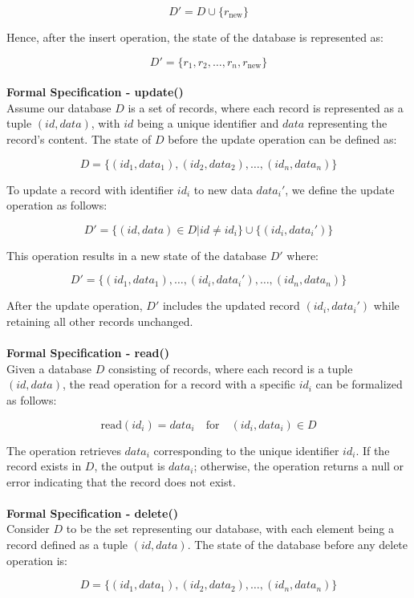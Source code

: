 \documentclass[12pt, titlepage]{article}
\begin{document}
\[
D' = D \cup \{r_{\text{new}}\}
\]

Hence, after the insert operation, the state of the database is represented as:

\[
D' = \{r_1, r_2, \ldots, r_n, r_{\text{new}}\}
\]
\\
\textbf{Formal Specification - update()}\\
Assume our database $D$ is a set of records, where each record is represented as a tuple $(id, data)$, with $id$ being a unique identifier and $data$ representing the record's content. The state of $D$ before the update operation can be defined as:

\[
D = \{(id_1, data_1), (id_2, data_2), \ldots, (id_n, data_n)\}
\]

To update a record with identifier $id_i$ to new data $data_i'$, we define the update operation as follows:

\[
D' = \{(id, data) \in D | id \neq id_i\} \cup \{(id_i, data_i')\}
\]

This operation results in a new state of the database $D'$ where:

\[
D' = \{(id_1, data_1), \ldots, (id_i, data_i'), \ldots, (id_n, data_n)\}
\]

After the update operation, $D'$ includes the updated record $(id_i, data_i')$ while retaining all other records unchanged.
\\\\
\textbf{Formal Specification - read()}\\
Given a database $D$ consisting of records, where each record is a tuple $(id, data)$, the read operation for a record with a specific $id_i$ can be formalized as follows:

\[
\text{read}(id_i) = data_i \quad \text{for} \quad (id_i, data_i) \in D
\]

The operation retrieves $data_i$ corresponding to the unique identifier $id_i$. If the record exists in $D$, the output is $data_i$; otherwise, the operation returns a null or error indicating that the record does not exist.
\\\\
\textbf{Formal Specification - delete()}\\
Consider $D$ to be the set representing our database, with each element being a record defined as a tuple $(id, data)$. The state of the database before any delete operation is:

\[
D = \{(id_1, data_1), (id_2, data_2), \ldots, (id_n, data_n)\}
\]
\end{document}
